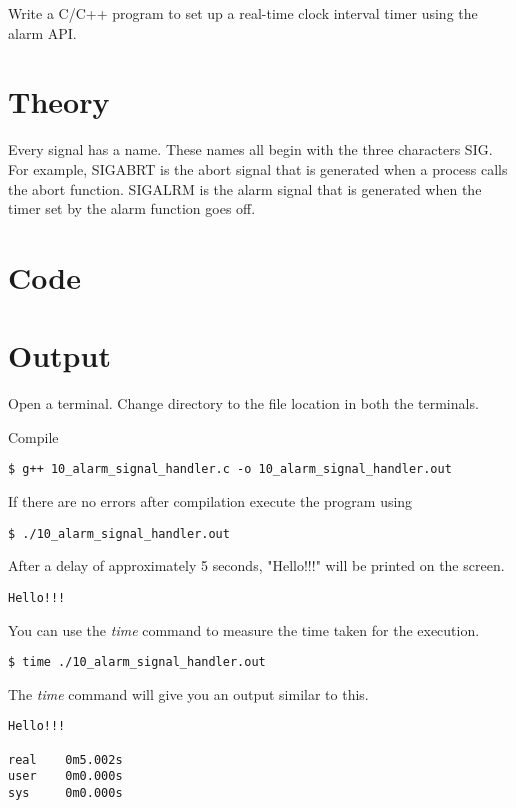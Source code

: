 Write a C/C++ program to set up a real-time clock interval timer using the alarm API.

\section{Theory}

Every signal has a name. These names all begin with the three characters SIG. For example, SIGABRT is the abort signal that is generated when a process calls the abort function. SIGALRM is the alarm signal that is generated when the timer set by the alarm function goes off.

\section{Code}



\section{Output}

Open a terminal. Change directory to the file location in both the terminals.

Compile
\begin{lstlisting}[style=shell-command]
$ g++ 10_alarm_signal_handler.c -o 10_alarm_signal_handler.out
\end{lstlisting}

If there are no errors after compilation execute the program using
\begin{lstlisting}[style=shell-command]
$ ./10_alarm_signal_handler.out
\end{lstlisting}

After a delay of approximately 5 seconds, "Hello!!!" will be printed on the screen.
\begin{lstlisting}[style=shell-output]
Hello!!!
\end{lstlisting}

You can use the \emph{time} command to measure the time taken for the execution.
\begin{lstlisting}[style=shell-command]
$ time ./10_alarm_signal_handler.out
\end{lstlisting}

The \emph{time} command will give you an output similar to this.
\begin{lstlisting}[style=shell-output]
Hello!!!

real    0m5.002s
user    0m0.000s
sys     0m0.000s
\end{lstlisting}

